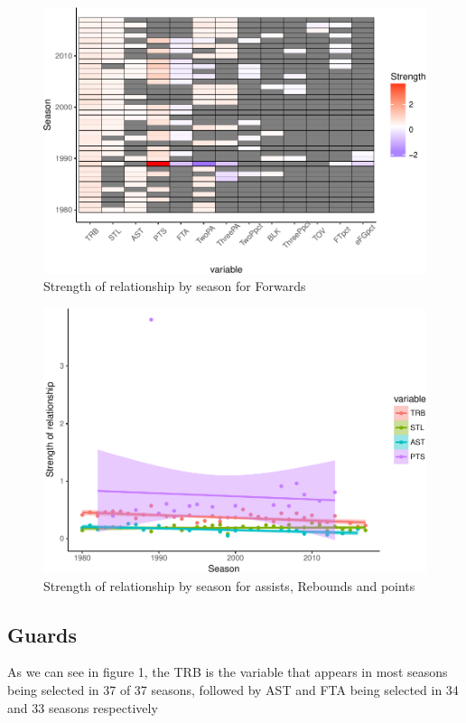 \documentclass[]{elsarticle} %
\makeatletter
\def\maxwidth{\ifdim\Gin@nat@width>\linewidth\linewidth
\else\Gin@nat@width\fi}
\let\Oldincludegraphics\includegraphics
\renewcommand{\includegraphics}[1]{\Oldincludegraphics[width=\maxwidth]{#1}}
\makeatother
\begin{document}
\begin{figure}[htbp]
\centering
\includegraphics{Coaching_Selection_files/figure-latex/unnamed-chunk-11-1.pdf}
\caption{Strength of relationship by season for Forwards}
\end{figure}

\begin{figure}[htbp]
\centering
\includegraphics{Coaching_Selection_files/figure-latex/unnamed-chunk-12-1.pdf}
\caption{Strength of relationship by season for assists, Rebounds and
points}
\end{figure}

\subsection{Guards}\label{guards}

As we can see in figure 1, the TRB is the variable that appears in most
seasons being selected in 37 of 37 seasons, followed by AST and FTA
being selected in 34 and 33 seasons respectively
\end{document}
